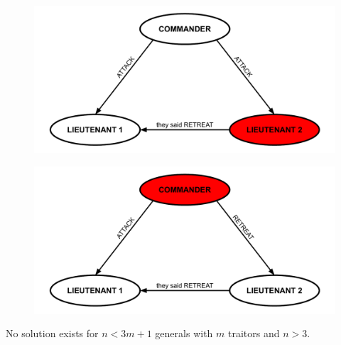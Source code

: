 \documentclass{beamer}
\theoremstyle{conjecture1}
\theoremstyle{conjecture2}
\begin{document}
\begin{frame}
    \begin{figure}
        \centering
        \includegraphics[scale=.35]{../figures/three_generals_loyal_commander.pdf}
    \end{figure}
    \begin{figure}
        \centering
        \includegraphics[scale=.35]{../figures/three_generals_unloyal_commander.pdf}
    \end{figure}
\end{frame}

\begin{frame}
    \begin{theorem}
        No solution exists for $n<3m+1$ generals with $m$ traitors and $n>3$.
    \end{theorem}
\end{frame}
\end{document}
